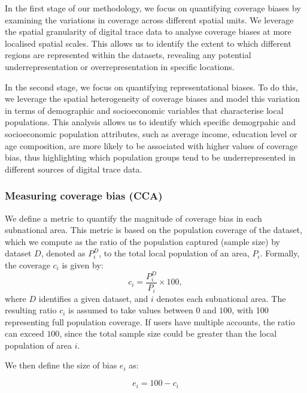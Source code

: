 \documentclass[]{rsos}%
\begin{document}
In the first stage of our methodology, we focus on quantifying coverage
biases by examining the variations in coverage across different spatial
units. We leverage the spatial granularity of digital trace data to
analyse coverage biases at more localised spatial scales. This allows us
to identify the extent to which different regions are represented within
the datasets, revealing any potential underrepresentation or
overrepresentation in specific locations.

In the second stage, we focus on quantifying representational biases. To
do this, we leverage the spatial heterogeneity of coverage biases and
model this variation in terms of demographic and socioeconomic variables
that characterise local populations. This analysis allows us to identify
which specific demogrpahic and socioeconomic population attributes, such
as average income, education level or age composition, are more likely
to be associated with higher values of coverage bias, thus highlighting
which population groups tend to be underrepresented in different sources
of digital trace data.

\subsubsection{Measuring coverage bias (CCA)}\label{measuring-coverage-bias-cca}

We define a metric to quantify the magnitude of coverage bias in each
subnational area. This metric is based on the population coverage of the
dataset, which we compute as the ratio of the population captured
(sample size) by dataset \(D\), denoted as \(P_i^D\), to the total local
population of an area, \(P_i\). Formally, the coverage \(c_i\) is given by:
\begin{equation}
c_i = \dfrac{P_i^D}{P_i} \times 100,
\end{equation} where \(D\) identifies a given dataset, and \(i\) denotes
each subnational area. The resulting ratio \(c_i\) is assumed to take
values between \(0\) and \(100\), with 100 representing full population
coverage. If users have multiple accounts, the ratio can exceed \(100\),
since the total sample size could be greater than the local population
of area \(i\).

We then define the size of bias \(e_i\) as:

\begin{equation} \label{eq:size-bias}
e_i = 100 - c_i
\end{equation}
\end{document}
